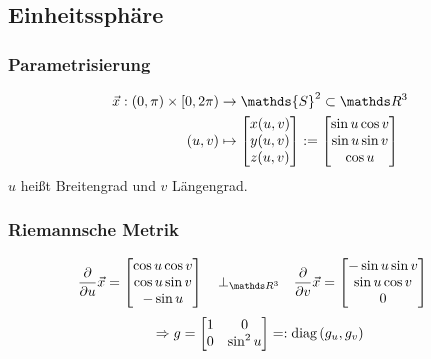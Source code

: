   \subsection{Einheitssphäre}
    \label{sphere}

    \subsubsection{Parametrisierung}
      \begin{align}
      \begin{aligned}
        \vec{x}: \left( 0, \pi \right) \times \left[ 0 , 2\pi \right)
                    &\rightarrow \mathds{S}^{2} \subset \R^{3} \\
             \left( u,v \right) 
                    &\mapsto\begin{bmatrix}
                              x(u,v) \\ y(u,v) \\ z(u,v)
                            \end{bmatrix}
                    := \begin{bmatrix}
                        \sin u \cos v \\
                        \sin u \sin v \\
                        \cos u
                      \end{bmatrix}
      \end{aligned}
      \end{align}
      \( u \) heißt Breitengrad und \( v \) Längengrad.

    \subsubsection{Riemannsche Metrik}
      \begin{align}
        \frac{\partial}{\partial u}\vec{x}
              &=\begin{bmatrix}
                  \cos u \cos v \\
                  \cos u \sin v \\
                  -\sin u
                \end{bmatrix}
              \quad\bot_{\R^{3}}\quad
              \frac{\partial}{\partial v}\vec{x}
              =\begin{bmatrix}
                        -\sin u \sin v \\
                        \sin u \cos v \\
                        0
                \end{bmatrix}
      \end{align}
      \begin{align}
        \Rightarrow g = \begin{bmatrix}
              1 & 0 \\ 0 & \sin^{2} u
            \end{bmatrix}
          =: \text{diag}\left( g_{u}, g_{v} \right)
      \end{align}

